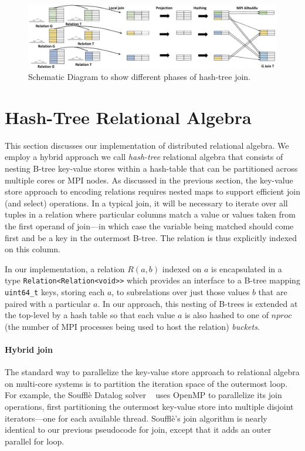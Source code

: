 

\begin{figure}[h]
	\includegraphics[width=\textwidth]{results/join_new.pdf}
	\caption{Schematic Diagram to show different phases of hash-tree join.}
	\label{fig:join}
\end{figure}



\section{Hash-Tree Relational Algebra}
\label{sec:impl}
%
This section discusses our implementation of distributed relational algebra. We employ a hybrid approach we call \emph{hash-tree} relational algebra that consists of nesting B-tree key-value stores within a hash-table that can be partitioned across multiple cores or MPI nodes. As discussed in the previous section, the key-value store approach to encoding relations requires nested maps to support efficient join (and select) operations. In a typical join, it will be necessary to iterate over all tuples in a relation where particular columns match a value or values taken from the first operand of join---in which case the variable being matched should come first and be a key in the outermost B-tree. The relation is thus explicitly indexed on this column.

In our implementation, a relation $R(a,b)$ indexed on $a$ is encapsulated in a type \texttt{Relation<Relation<void>>} which provides an interface to a B-tree mapping \texttt{uint64\_t} keys, storing each $a$, to subrelations over just those values $b$ that are paired with a particular $a$. In our approach, this nesting of B-trees is extended at the top-level by a hash table so that each value $a$ is also hashed to one of $\mathit{nproc}$ (the number of MPI processes being used to host the relation) \textit{buckets}.

\paragraph{Hybrid join} The standard way to parallelize the key-value store approach to relational algebra on multi-core systems is to partition the iteration space of the outermost loop. For example, the Souffl\`e Datalog solver ~\cite{Scholz:2016:FLP:2892208.2892226} uses OpenMP to parallelize its join operations, first partitioning the outermost key-value store into multiple disjoint iterators---one for each available thread. Souffl\`e's join algorithm is nearly identical to our previous pseudocode for join, except that it adds an outer parallel for loop.   

